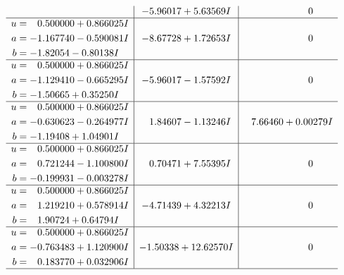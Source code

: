 \documentclass[1p]{elsarticle_modified}
\theoremstyle{definition}
\begin{document}
$$\begin{array}{c|c|c}
 & -5.96017 + 5.63569 I & \phantom{-0.000000 } 0 \\ \hline\begin{aligned}
u &= \phantom{-}0.500000 + 0.866025 I \\
a &= -1.167740 - 0.590081 I \\
b &= -1.82054 - 0.80138 I\end{aligned}
 & -8.67728 + 1.72653 I & \phantom{-0.000000 } 0 \\ \hline\begin{aligned}
u &= \phantom{-}0.500000 + 0.866025 I \\
a &= -1.129410 - 0.665295 I \\
b &= -1.50665 + 0.35250 I\end{aligned}
 & -5.96017 - 1.57592 I & \phantom{-0.000000 } 0 \\ \hline\begin{aligned}
u &= \phantom{-}0.500000 + 0.866025 I \\
a &= -0.630623 - 0.264977 I \\
b &= -1.19408 + 1.04901 I\end{aligned}
 & \phantom{-}1.84607 - 1.13246 I & \phantom{-}7.66460 + 0.00279 I \\ \hline\begin{aligned}
u &= \phantom{-}0.500000 + 0.866025 I \\
a &= \phantom{-}0.721244 - 1.100800 I \\
b &= -0.199931 - 0.003278 I\end{aligned}
 & \phantom{-}0.70471 + 7.55395 I & \phantom{-0.000000 } 0 \\ \hline\begin{aligned}
u &= \phantom{-}0.500000 + 0.866025 I \\
a &= \phantom{-}1.219210 + 0.578914 I \\
b &= \phantom{-}1.90724 + 0.64794 I\end{aligned}
 & -4.71439 + 4.32213 I & \phantom{-0.000000 } 0 \\ \hline\begin{aligned}
u &= \phantom{-}0.500000 + 0.866025 I \\
a &= -0.763483 + 1.120900 I \\
b &= \phantom{-}0.183770 + 0.032906 I\end{aligned}
 & -1.50338 + 12.62570 I & \phantom{-0.000000 } 0\\
 \hline 
 \end{array}$$\newpage$$\begin{array}{c|c|c}  

\end{array}$$
\end{document}
